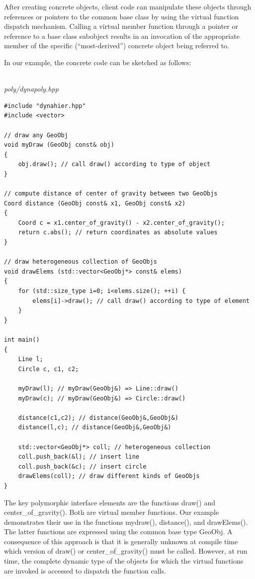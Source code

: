 After creating concrete objects, client code can manipulate these objects through references or pointers to the common base class by using the virtual function dispatch mechanism. Calling a virtual member function through a pointer or reference to a base class subobject results in an invocation of the appropriate member of the specific (“most-derived”) concrete object being referred to.

In our example, the concrete code can be sketched as follows:

\hspace*{\fill} \\ %
\noindent
\textit{poly/dynapoly.hpp}
\begin{lstlisting}[style=styleCXX]
#include "dynahier.hpp"
#include <vector>

// draw any GeoObj
void myDraw (GeoObj const& obj)
{
	obj.draw(); // call draw() according to type of object
}

// compute distance of center of gravity between two GeoObjs
Coord distance (GeoObj const& x1, GeoObj const& x2)
{
	Coord c = x1.center_of_gravity() - x2.center_of_gravity();
	return c.abs(); // return coordinates as absolute values
}

// draw heterogeneous collection of GeoObjs
void drawElems (std::vector<GeoObj*> const& elems)
{
	for (std::size_type i=0; i<elems.size(); ++i) {
		elems[i]->draw(); // call draw() according to type of element
	}
}

int main()
{
	Line l;
	Circle c, c1, c2;
	
	myDraw(l); // myDraw(GeoObj&) => Line::draw()
	myDraw(c); // myDraw(GeoObj&) => Circle::draw()
	
	distance(c1,c2); // distance(GeoObj&,GeoObj&)
	distance(l,c); // distance(GeoObj&,GeoObj&)
	
	std::vector<GeoObj*> coll; // heterogeneous collection
	coll.push_back(&l); // insert line
	coll.push_back(&c); // insert circle
	drawElems(coll); // draw different kinds of GeoObjs
}
\end{lstlisting}

The key polymorphic interface elements are the functions draw() and center\_of\_gravity(). Both are virtual member functions. Our example demonstrates their use in the functions mydraw(), distance(), and drawElems(). The latter functions are expressed using the common base type GeoObj. A consequence of this approach is that it is generally unknown at compile time which version of draw() or center\_of\_gravity() must be called. However, at run time, the complete dynamic type of the objects for which the virtual functions are invoked is accessed to dispatch the function calls.

